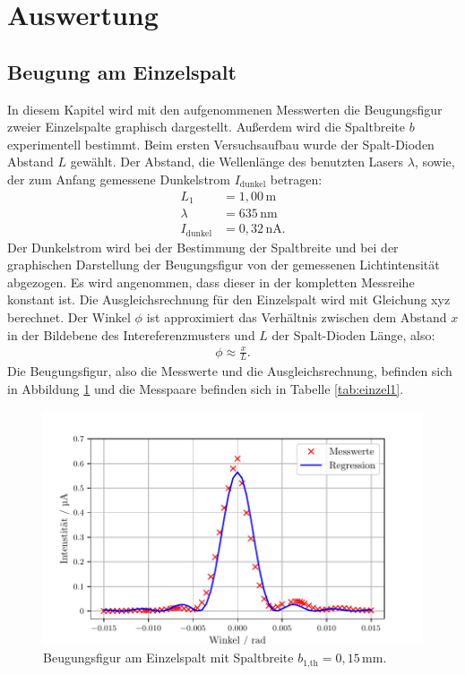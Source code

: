 \section{Auswertung}
\label{sec:Auswertung}
\subsection{Beugung am Einzelspalt}
In diesem Kapitel wird mit den aufgenommenen Messwerten die Beugungsfigur zweier Einzelspalte graphisch dargestellt.
Außerdem wird die Spaltbreite $b$ experimentell bestimmt.
Beim ersten Versuchsaufbau wurde der Spalt-Dioden Abstand $L$ gewählt. Der Abstand, die Wellenlänge
des benutzten Lasers $\lambda$, sowie, der zum Anfang gemessene Dunkelstrom $I_\text{dunkel}$ betragen:
\begin{align*}
  L_1 &= 1,00\,\si{\meter} \\
  \lambda &= 635\,\si{\nano\meter} \\
  I_\text{dunkel} &= 0,32\,\si{\nano\ampere}.
\end{align*}
Der Dunkelstrom wird bei der Bestimmung der Spaltbreite und bei der graphischen
Darstellung der Beugungsfigur von der gemessenen Lichtintensität abgezogen. Es wird angenommen, dass dieser in der kompletten
Messreihe konstant ist.
Die Ausgleichsrechnung für den Einzelspalt wird mit Gleichung xyz berechnet. Der Winkel $\phi$ ist approximiert
das Verhältnis zwischen dem Abstand $x$ in der Bildebene des Intereferenzmusters und $L$ der Spalt-Dioden Länge, also:
\begin{align*}
\phi \approx \frac{x}{L}.
\end{align*}
Die Beugungsfigur, also die Messwerte und die Ausgleichsrechnung, befinden sich in Abbildung \ref{fig:einzel1}
und die Messpaare befinden sich in Tabelle \ref{tab:einzel1}.


\begin{figure}[H]
  \center
  \includegraphics[scale = 0.75]{einzel1.pdf}
  \caption{Beugungsfigur am Einzelspalt mit Spaltbreite $b_\text{1,th} = 0,15\,\si{\milli\meter}$.}
  \label{fig:einzel1}
\end{figure}

